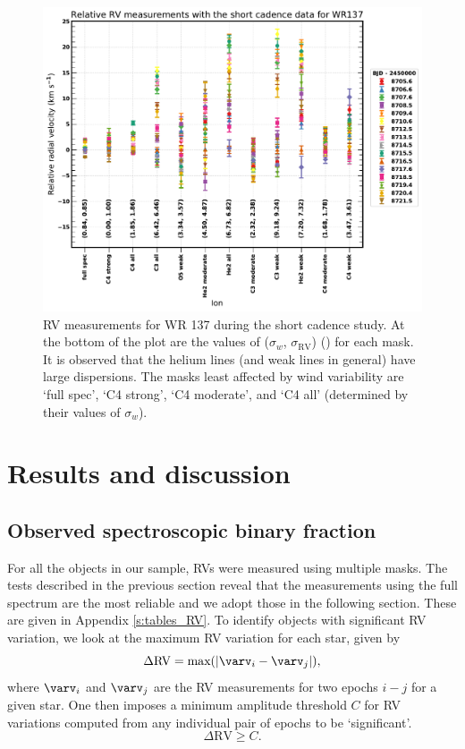 \begin{figure}
    \centering
    \includegraphics[width=\hsize]{chapters/WC/image/RV_SC_ions.pdf}
    \caption{RV measurements for WR 137 during the short cadence study. At the bottom of the plot are the values of ($\sigma_w$, $\sigma_\textrm{RV}$) (\kms{}) for each mask. It is observed that the helium lines (and weak lines in general) have large dispersions. The masks least affected by wind variability are `full spec', `C4 strong', `C4 moderate', and `C4 all' (determined by their values of $\sigma_w$).}
    \label{fig:ions}
\end{figure}
\section{Results and discussion}\label{sect:results}
\subsection{Observed spectroscopic binary fraction}
For all the objects in our sample, RVs were measured using multiple masks. The tests described in the previous section reveal that the measurements using the full spectrum are the most reliable and we adopt those in the following section. These are given in Appendix \ref{s:tables_RV}. To identify objects with significant RV variation, we look at the maximum RV variation for each star, given by
\begin{equation}\label{eq:del_RV}
\Delta \textrm{RV} = \textrm{max}(|\varv_i - \varv_j|),
\end{equation}
where $\varv_i$ and $\varv_j$ are the RV measurements for two epochs $i-j$ for a given star. One then imposes a minimum amplitude threshold $C$ for RV variations computed from any individual pair of epochs to be `significant'.
\begin{equation}\label{eq:signif_crit}
\Delta \textrm{RV} \ge C.
\end{equation}

